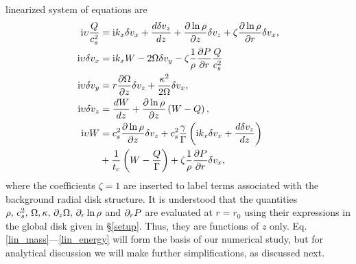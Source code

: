 linearized system of equations are 
\begin{align}
  \mathrm{i}\upsilon \frac{Q}{c_s^2}  &=  \mathrm{i} k_x \delta v_x + \frac{d\delta
    v_z}{dz} + \frac{\partial\ln{\rho}}{\partial z}\delta v_z + \zeta
  \frac{\partial\ln{\rho}}{\partial r} \delta v_x,\label{lin_mass}\\
  \mathrm{i}\upsilon \delta v_x  &= \mathrm{i} k_x W - 2\Omega\delta v_y -
  \zeta\frac{1}{\rho}\frac{\partial P}{\partial r}\frac{Q}{c_s^2}\label{lin_vx}\\
   \mathrm{i} \upsilon\delta v_y &= r\frac{\partial \Omega}{\partial z}\delta v_z +
  \frac{\kappa^2}{2\Omega}\delta v_x, \label{lin_vy}\\
   \mathrm{i}\upsilon\delta v_z &= \frac{dW}{dz} +
  \frac{\partial\ln{\rho}}{\partial z}\left(W-Q\right), \label{lin_vz}\\
  \mathrm{i} \upsilon W &= c_s^2\frac{\partial\ln{\rho}}{\partial z}\delta v_z +
  c_s^2\frac{\gamma}{\Gamma} \left(\mathrm{i} k_x\delta v_x + \frac{d\delta
      v_z}{dz}\right) \notag\\
  &+ \frac{1}{t_c}\left(W - \frac{Q}{\Gamma}\right) +
  \zeta\frac{1}{\rho}\frac{\partial P}{\partial r}\delta v_x,\label{lin_energy}
\end{align}
where the coefficients $\zeta=1$ are inserted to label terms
associated with the background radial disk structure. 
It is understood that the quantities $\rho,\,c_s^2,\,\Omega,\kappa,\, 
\partial_z\Omega,\, \partial_r\ln{\rho} $ and $ \partial_r P$ are evaluated at $r=r_0$
using their expressions in the global disk given in \S\ref{setup}. Thus, they are functions of $z$ only. 
Eq. \ref{lin_mass}---\ref{lin_energy} will form the basis of our numerical
study, but for analytical discussion
we will make further simplifications, as discussed next.
